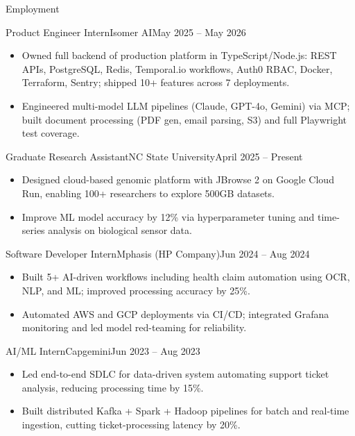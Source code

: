 \documentclass[]{mcdowellcv}
\begin{document}
\makeheader

\begin{cvsection}{Employment}
  \begin{cvsubsection}{Product Engineer Intern}{Isomer AI}{May 2025 -- May 2026}
    \begin{itemize}
      \item Owned full backend of production platform in TypeScript/Node.js: REST APIs, PostgreSQL, Redis, Temporal.io workflows, Auth0 RBAC, Docker, Terraform, Sentry; shipped 10+ features across 7 deployments.
      \item Engineered multi-model LLM pipelines (Claude, GPT-4o, Gemini) via MCP; built document processing (PDF gen, email parsing, S3) and full Playwright test coverage.
    \end{itemize}
    \vspace{-1.5pt}
  \end{cvsubsection}

  \begin{cvsubsection}{Graduate Research Assistant}{NC State University}{April 2025 -- Present}
    \begin{itemize}
      \item Designed cloud-based genomic platform with JBrowse 2 on Google Cloud Run, enabling 100+ researchers to explore 500GB datasets.
      \item Improve ML model accuracy by 12\% via hyperparameter tuning and time-series analysis on biological sensor data.
    \end{itemize}
    \vspace{-1.5pt}
  \end{cvsubsection}

  \begin{cvsubsection}{Software Developer Intern}{Mphasis (HP Company)}{Jun 2024 -- Aug 2024}
    \begin{itemize}
      \item Built 5+ AI-driven workflows including health claim automation using OCR, NLP, and ML; improved processing accuracy by 25\%.
      \item Automated AWS and GCP deployments via CI/CD; integrated Grafana monitoring and led model red-teaming for reliability.
    \end{itemize}
    \vspace{-1.5pt}
  \end{cvsubsection}

  \begin{cvsubsection}{AI/ML Intern}{Capgemini}{Jun 2023 -- Aug 2023}
    \begin{itemize}
      \item Led end-to-end SDLC for data-driven system automating support ticket analysis, reducing processing time by 15\%.
      \item Built distributed Kafka + Spark + Hadoop pipelines for batch and real-time ingestion, cutting ticket-processing latency by 20\%.
    \end{itemize}
    \vspace{-1.5pt}
  \end{cvsubsection}
\end{cvsection}
\end{document}
